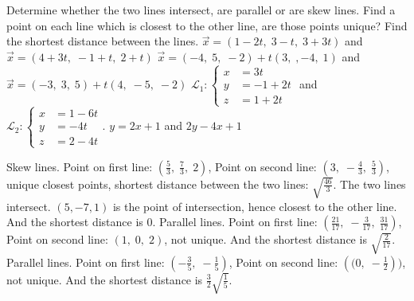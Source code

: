 
\begin{Exercise}[
name={},
title={}, 
difficulty=0,
origin={\cite{YL}}]
Determine whether the two lines intersect, are parallel or are skew lines.  Find a point on each line which is closest to the other line, are those points unique?  Find the shortest distance between the lines.
\Question $\vec{x}=(1-2t,\;3-t,\;3+3t)$ and $\vec{x}=(4+3t,\; -1+t,\; 2+t)$
\Question $\vec{x}=(-4,\;5,\;-2)+t(3,\;,-4,\; 1)$ and $\vec{x}=(-3,\; 3,\; 5)+t(4,\;-5,\;-2)$
\Question $\mathcal{L}_1: \left\{\begin{aligned} x&=3t\\y&=-1+2t\\z&=1+2t\end{aligned}\right.$ and 
$\mathcal{L}_2: \left\{\begin{aligned} x&=1-6t\\y&=-4t\\z&=2-4t\end{aligned}\right.$.
\Question $y=2x+1$ and $2y-4x+1$

\end{Exercise}
\begin{Answer}
\Question Skew lines. 
Point on first line: $\left(\frac{5}{3},\; \frac{7}{3},\; 2\right)$, Point on second line: $\left(3,\; -\frac{4}{3},\; \frac{5}{3}\right)$, unique closest points, shortest distance between the two lines: $\sqrt{\frac{46}{3}}$.
\Question The two lines intersect. $(5, -7, 1)$ is the point of intersection, hence closest to the other line.  And the shortest distance is $0$.
\Question Parallel lines. Point on first line: $\left(\frac{21}{17},\; -\frac{3}{17},\; \frac{31}{17}\right)$, Point on second line: $\left(1,\; 0,\; 2\right)$, not unique. And the shortest distance is $\sqrt{\frac{2}{17}}$.
\Question Parallel lines. 
Point on first line: $\left(-\frac{3}{5},\; -\frac{1}{5}\right)$, Point on second line: $\left((0,\; -\frac{1}{2}\right))$, not unique. And the shortest distance is $\frac{3}{2}\sqrt{\frac{1}{5}}$.
\end{Answer}
